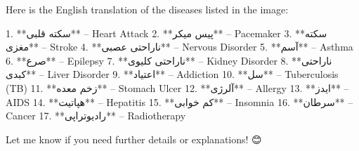 Here is the English translation of the diseases listed in the image:

1. **سکته قلبی** – Heart Attack  
2. **پیس میکر** – Pacemaker  
3. **سکته مغزی** – Stroke  
4. **ناراحتی عصبی** – Nervous Disorder  
5. **آسم** – Asthma  
6. **صرع** – Epilepsy  
7. **ناراحتی کلیوی** – Kidney Disorder  
8. **ناراحتی کبدی** – Liver Disorder  
9. **اعتیاد** – Addiction  
10. **سل** – Tuberculosis (TB)  
11. **زخم معده** – Stomach Ulcer  
12. **آلرژی** – Allergy  
13. **ایدز** – AIDS  
14. **هپاتیت** – Hepatitis  
15. **کم خوابی** – Insomnia  
16. **سرطان** – Cancer  
17. **رادیوتراپی** – Radiotherapy  

Let me know if you need further details or explanations! 😊